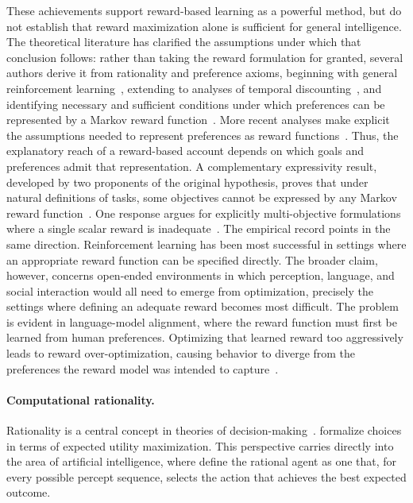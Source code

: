 \documentclass[acmsmall,screen,review,anonymous]{acmart}
\begin{document}
These achievements support reward-based learning as a powerful method, but do not establish that reward maximization alone is sufficient for general intelligence.
%
The theoretical literature has clarified the assumptions under which that conclusion follows: rather than taking the reward formulation for granted, several authors derive it from rationality and preference axioms, beginning with general reinforcement learning~\citep{sunehag2011axioms}, extending to analyses of temporal discounting~\citep{pitis2019rethinking}, and identifying necessary and sufficient conditions under which preferences can be represented by a Markov reward function~\citep{shakerinava2022utility}.
%
More recent analyses make explicit the assumptions needed to represent preferences as reward functions~\citep{bowling2023settleing}.
%
Thus, the explanatory reach of a reward-based account depends on which goals and preferences admit that representation.
%
A complementary expressivity result, developed by two proponents of the original hypothesis, proves that under natural definitions of tasks, some objectives cannot be expressed by any Markov reward function~\citep{abel2021expressivity}.
%
One response argues for explicitly multi-objective formulations where a single scalar reward is inadequate~\citep{vamplew2023scalar}.
%
The empirical record points in the same direction.
%
Reinforcement learning has been most successful in settings where an appropriate reward function can be specified directly. 
%
The broader claim, however, concerns open-ended environments in which perception, language, and social interaction would all need to emerge from optimization, precisely the settings where defining an adequate reward becomes most difficult. 
%
The problem is evident in language-model alignment, where the reward function must first be learned from human preferences.
%
Optimizing that learned reward too aggressively leads to reward over-optimization, causing behavior to diverge from the preferences the reward model was intended to capture~\citep{gao2023scaling}.


\paragraph{Computational rationality.} Rationality is a central concept in theories of decision-making~\citep{knauff2021handbook}.
\citet{vonneumann1944} formalize choices in terms of expected utility maximization.
%
This perspective carries directly into the area of artificial intelligence, where \citet{russellnorvig2020, RUSSELL199757} define the rational agent as one that, for every possible percept sequence, selects the action that achieves the best expected outcome. 
\end{document}
